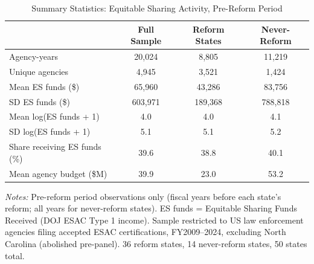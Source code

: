 \begin{table}[!htbp]
\centering
\begin{threeparttable}
\caption{Summary Statistics: Equitable Sharing Activity, Pre-Reform Period}
\label{tab:summary}
\begin{tabular}{@{}lccc@{}}
\toprule
 & Full Sample & Reform States & Never-Reform \\
\midrule
Agency-years & 20,024 & 8,805 & 11,219 \\
Unique agencies & 4,945 & 3,521 & 1,424 \\
Mean ES funds (\$) & 65,960 & 43,286 & 83,756 \\
SD ES funds (\$) & 603,971 & 189,368 & 788,818 \\
Mean log(ES funds + 1) & 4.0 & 4.0 & 4.1 \\
SD log(ES funds + 1) & 5.1 & 5.1 & 5.2 \\
Share receiving ES funds (\%) & 39.6 & 38.8 & 40.1 \\
Mean agency budget (\$M) & 39.9 & 23.0 & 53.2 \\
\bottomrule
\end{tabular}
\begin{tablenotes}[flushleft]\small
\item \textit{Notes:} Pre-reform period observations only (fiscal years before each state's reform; all years for never-reform states). ES funds = Equitable Sharing Funds Received (DOJ ESAC Type 1 income). Sample restricted to US law enforcement agencies filing accepted ESAC certifications, FY2009--2024, excluding North Carolina (abolished pre-panel). 36 reform states, 14 never-reform states, 50 states total.
\end{tablenotes}
\end{threeparttable}
\end{table}


